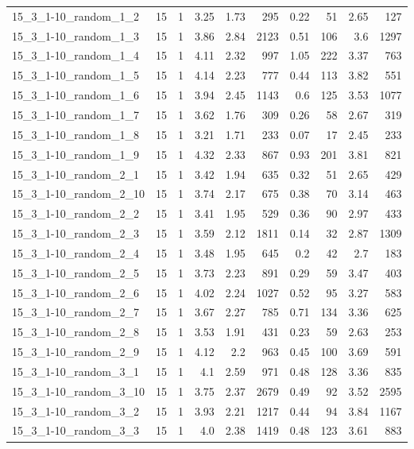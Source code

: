 \begin{center}
\begin{scriptsize}
\begin{longtable}{lrrrrrrrrr}
15\_3\_1-10\_random\_1\_2 & 15 & 1 & 3.25 & 1.73 & 295 & 0.22 & 51 & 2.65 & 127\\
15\_3\_1-10\_random\_1\_3 & 15 & 1 & 3.86 & 2.84 & 2123 & 0.51 & 106 & 3.6 & 1297\\
15\_3\_1-10\_random\_1\_4 & 15 & 1 & 4.11 & 2.32 & 997 & 1.05 & 222 & 3.37 & 763\\
15\_3\_1-10\_random\_1\_5 & 15 & 1 & 4.14 & 2.23 & 777 & 0.44 & 113 & 3.82 & 551\\
15\_3\_1-10\_random\_1\_6 & 15 & 1 & 3.94 & 2.45 & 1143 & 0.6 & 125 & 3.53 & 1077\\
15\_3\_1-10\_random\_1\_7 & 15 & 1 & 3.62 & 1.76 & 309 & 0.26 & 58 & 2.67 & 319\\
15\_3\_1-10\_random\_1\_8 & 15 & 1 & 3.21 & 1.71 & 233 & 0.07 & 17 & 2.45 & 233\\
15\_3\_1-10\_random\_1\_9 & 15 & 1 & 4.32 & 2.33 & 867 & 0.93 & 201 & 3.81 & 821\\
15\_3\_1-10\_random\_2\_1 & 15 & 1 & 3.42 & 1.94 & 635 & 0.32 & 51 & 2.65 & 429\\
15\_3\_1-10\_random\_2\_10 & 15 & 1 & 3.74 & 2.17 & 675 & 0.38 & 70 & 3.14 & 463\\
15\_3\_1-10\_random\_2\_2 & 15 & 1 & 3.41 & 1.95 & 529 & 0.36 & 90 & 2.97 & 433\\
15\_3\_1-10\_random\_2\_3 & 15 & 1 & 3.59 & 2.12 & 1811 & 0.14 & 32 & 2.87 & 1309\\
15\_3\_1-10\_random\_2\_4 & 15 & 1 & 3.48 & 1.95 & 645 & 0.2 & 42 & 2.7 & 183\\
15\_3\_1-10\_random\_2\_5 & 15 & 1 & 3.73 & 2.23 & 891 & 0.29 & 59 & 3.47 & 403\\
15\_3\_1-10\_random\_2\_6 & 15 & 1 & 4.02 & 2.24 & 1027 & 0.52 & 95 & 3.27 & 583\\
15\_3\_1-10\_random\_2\_7 & 15 & 1 & 3.67 & 2.27 & 785 & 0.71 & 134 & 3.36 & 625\\
15\_3\_1-10\_random\_2\_8 & 15 & 1 & 3.53 & 1.91 & 431 & 0.23 & 59 & 2.63 & 253\\
15\_3\_1-10\_random\_2\_9 & 15 & 1 & 4.12 & 2.2 & 963 & 0.45 & 100 & 3.69 & 591\\
15\_3\_1-10\_random\_3\_1 & 15 & 1 & 4.1 & 2.59 & 971 & 0.48 & 128 & 3.36 & 835\\
15\_3\_1-10\_random\_3\_10 & 15 & 1 & 3.75 & 2.37 & 2679 & 0.49 & 92 & 3.52 & 2595\\
15\_3\_1-10\_random\_3\_2 & 15 & 1 & 3.93 & 2.21 & 1217 & 0.44 & 94 & 3.84 & 1167\\
15\_3\_1-10\_random\_3\_3 & 15 & 1 & 4.0 & 2.38 & 1419 & 0.48 & 123 & 3.61 & 883\\

\end{longtable}
\end{scriptsize}
\end{center}
